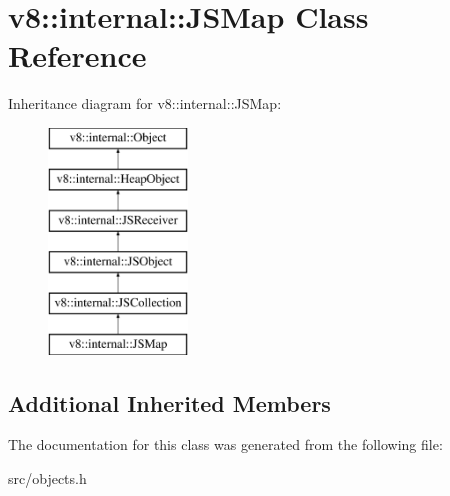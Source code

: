 \hypertarget{classv8_1_1internal_1_1_j_s_map}{}\section{v8\+:\+:internal\+:\+:J\+S\+Map Class Reference}
\label{classv8_1_1internal_1_1_j_s_map}
Inheritance diagram for v8\+:\+:internal\+:\+:J\+S\+Map\+:\begin{figure}[H]
\begin{center}
\leavevmode
\includegraphics[height=6.000000cm]{classv8_1_1internal_1_1_j_s_map}
\end{center}
\end{figure}
\subsection*{Additional Inherited Members}


The documentation for this class was generated from the following file\+:\begin{DoxyCompactItemize}
\item 
src/objects.\+h\end{DoxyCompactItemize}
